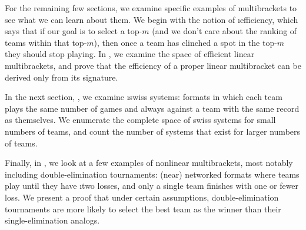 {    For the remaining few sections, we examine specific examples of multibrackets to see what we can learn about them. We begin with the notion of \i{efficiency}, which says that if our goal is to select a top-$m$ (and we don't care about the ranking of teams within that top-$m$), then once a team has clinched a spot in the top-$m$ they should stop playing. In , we examine the space of efficient linear multibrackets, and prove that the efficiency of a proper linear multibracket can be derived only from its signature.

    In the next section, , we examine \i{swiss systems}: formats in which each team plays the same number of games and always against a team with the same record as themselves. We enumerate the complete space of swiss systems for small numbers of teams, and count the number of systems that exist for larger numbers of teams.

    Finally, in , we look at a few examples of nonlinear multibrackets, most notably including double-elimination tournaments: (near) networked formats where teams play until they have \i{two} losses, and only a single team finishes with one or fewer loss. We present a proof that under certain assumptions, double-elimination tournaments are more likely to select the best team as the winner than their single-elimination analogs.
}









